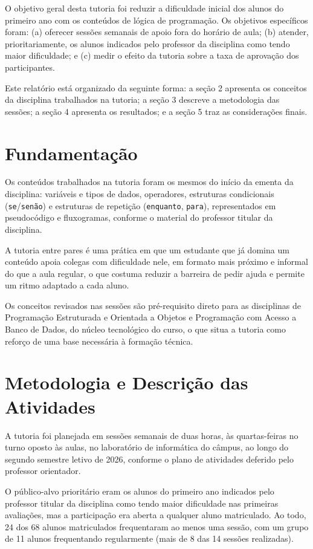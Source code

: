 \documentclass[article,12pt,a4paper]{abntex2}
\begin{document}
O objetivo geral desta tutoria foi reduzir a dificuldade inicial dos
alunos do primeiro ano com os conteúdos de lógica de programação. Os
objetivos específicos foram: (a) oferecer sessões semanais de apoio fora
do horário de aula; (b) atender, prioritariamente, os alunos indicados
pelo professor da disciplina como tendo maior dificuldade; e (c) medir o
efeito da tutoria sobre a taxa de aprovação dos participantes.

Este relatório está organizado da seguinte forma: a seção 2 apresenta os
conceitos da disciplina trabalhados na tutoria; a seção 3 descreve a
metodologia das sessões; a seção 4 apresenta os resultados; e a seção 5
traz as considerações finais.

\section{Fundamentação}

Os conteúdos trabalhados na tutoria foram os mesmos do início da ementa da
disciplina: variáveis e tipos de dados, operadores, estruturas
condicionais (\texttt{se}/\texttt{senão}) e estruturas de repetição
(\texttt{enquanto}, \texttt{para}), representados em pseudocódigo e
fluxogramas, conforme o material do professor titular da disciplina.

A tutoria entre pares é uma prática em que um estudante que já domina um
conteúdo apoia colegas com dificuldade nele, em formato mais próximo e
informal do que a aula regular, o que costuma reduzir a barreira de pedir
ajuda e permite um ritmo adaptado a cada aluno.

Os conceitos revisados nas sessões são pré-requisito direto para as
disciplinas de Programação Estruturada e Orientada a Objetos e Programação
com Acesso a Banco de Dados, do núcleo tecnológico do curso, o que situa a
tutoria como reforço de uma base necessária à formação técnica.

\section{Metodologia e Descrição das Atividades}

A tutoria foi planejada em sessões semanais de duas horas, às
quartas-feiras no turno oposto às aulas, no laboratório de informática do
câmpus, ao longo do segundo semestre letivo de 2026, conforme o plano de
atividades deferido pelo professor orientador.

O público-alvo prioritário eram os alunos do primeiro ano indicados pelo
professor titular da disciplina como tendo maior dificuldade nas primeiras
avaliações, mas a participação era aberta a qualquer aluno matriculado.
Ao todo, 24 dos 68 alunos matriculados frequentaram ao menos uma sessão,
com um grupo de 11 alunos frequentando regularmente (mais de 8 das 14
sessões realizadas).
\end{document}
